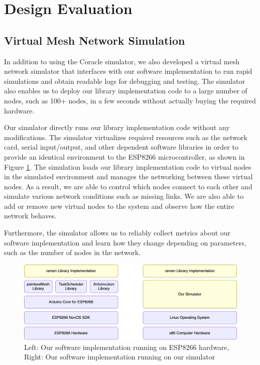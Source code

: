 \section{Design Evaluation}

\subsection{Virtual Mesh Network Simulation}
\label{sec:virtual_mesh_simulation}

In addition to using the Coracle simulator, we also developed a virtual mesh network simulator that interfaces with our software implementation to run rapid simulations and obtain readable logs for debugging and testing. The simulator also enables us to deploy our library implementation code to a large number of nodes, such as 100+ nodes, in a few seconds without actually buying the required hardware.

Our simulator directly runs our library implementation code without any modifications. The simulator virtualizes required resources such as the network card, serial input/output, and other dependent software libraries in order to provide an identical environment to the ESP8266 microcontroller, as shown in Figure \ref{fig:virtual_esp_diagram}. The simulation loads our library implementation code to virtual nodes in the simulated environment and manages the networking between these virtual nodes. As a result, we are able to control which nodes connect to each other and simulate various network conditions such as missing links. We are also able to add or remove new virtual nodes to the system and observe how the entire network behaves.

Furthermore, the simulator allows us to reliably collect metrics about our software implementation and learn how they change depending on parameters, such as the number of nodes in the network.


\begin{figure}[H]
    \centering
    \includegraphics[width=0.85\columnwidth]{images/virtual_esp.png}
    \caption{Left: Our software implementation running on ESP8266 hardware, Right: Our software implementation running on our simulator }
    \label{fig:virtual_esp_diagram}
\end{figure}



